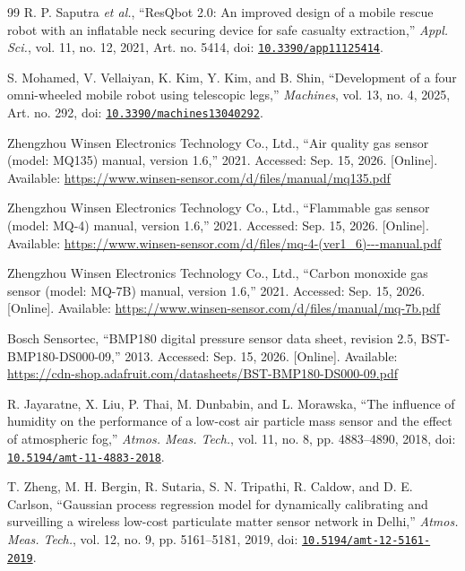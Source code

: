 \begin{thebibliography}{99}
R. P. Saputra \textit{et al.}, “ResQbot 2.0: An improved design of a mobile rescue robot with an inflatable neck securing device for safe casualty extraction,” \textit{Appl. Sci.}, vol. 11, no. 12, 2021, Art. no. 5414, doi: \href{https://doi.org/10.3390/app11125414}{\nolinkurl{10.3390/app11125414}}.

S. Mohamed, V. Vellaiyan, K. Kim, Y. Kim, and B. Shin, “Development of a four omni-wheeled mobile robot using telescopic legs,” \textit{Machines}, vol. 13, no. 4, 2025, Art. no. 292, doi: \href{https://doi.org/10.3390/machines13040292}{\nolinkurl{10.3390/machines13040292}}.

Zhengzhou Winsen Electronics Technology Co., Ltd., “Air quality gas sensor (model: MQ135) manual, version 1.6,” 2021. Accessed: Sep. 15, 2026. [Online]. Available: \url{https://www.winsen-sensor.com/d/files/manual/mq135.pdf}

Zhengzhou Winsen Electronics Technology Co., Ltd., “Flammable gas sensor (model: MQ-4) manual, version 1.6,” 2021. Accessed: Sep. 15, 2026. [Online]. Available: \url{https://www.winsen-sensor.com/d/files/mq-4-(ver1_6)---manual.pdf}

Zhengzhou Winsen Electronics Technology Co., Ltd., “Carbon monoxide gas sensor (model: MQ-7B) manual, version 1.6,” 2021. Accessed: Sep. 15, 2026. [Online]. Available: \url{https://www.winsen-sensor.com/d/files/manual/mq-7b.pdf}

Bosch Sensortec, “BMP180 digital pressure sensor data sheet, revision 2.5, BST-BMP180-DS000-09,” 2013. Accessed: Sep. 15, 2026. [Online]. Available: \url{https://cdn-shop.adafruit.com/datasheets/BST-BMP180-DS000-09.pdf}

R. Jayaratne, X. Liu, P. Thai, M. Dunbabin, and L. Morawska, “The influence of humidity on the performance of a low-cost air particle mass sensor and the effect of atmospheric fog,” \textit{Atmos. Meas. Tech.}, vol. 11, no. 8, pp. 4883--4890, 2018, doi: \href{https://doi.org/10.5194/amt-11-4883-2018}{\nolinkurl{10.5194/amt-11-4883-2018}}.

T. Zheng, M. H. Bergin, R. Sutaria, S. N. Tripathi, R. Caldow, and D. E. Carlson, “Gaussian process regression model for dynamically calibrating and surveilling a wireless low-cost particulate matter sensor network in Delhi,” \textit{Atmos. Meas. Tech.}, vol. 12, no. 9, pp. 5161--5181, 2019, doi: \href{https://doi.org/10.5194/amt-12-5161-2019}{\nolinkurl{10.5194/amt-12-5161-2019}}.


\end{thebibliography}
